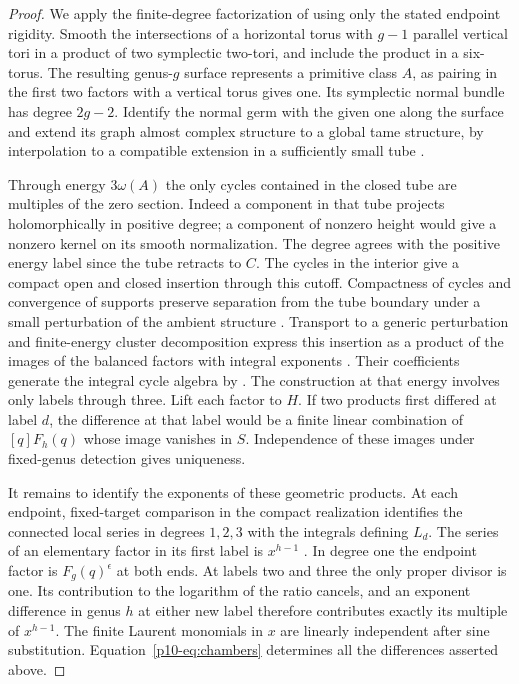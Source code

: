 \begin{proof}
We apply the finite-degree factorization of \cite[Corollary~3.2]{WueUnramified}
using only the stated endpoint rigidity. Smooth the intersections of a
horizontal torus with $g-1$ parallel vertical tori in a product of
two symplectic two-tori, and include the product in a six-torus. The
resulting genus-$g$ surface represents a primitive class $A$,
as pairing in the first two factors with a vertical torus gives
one. Its symplectic normal bundle has degree $2g-2$. Identify the
normal germ with the given one along the surface and extend its graph
almost complex structure to a global tame structure, by interpolation
to a compatible extension in a sufficiently small tube
\cite[proof of Proposition~3.1]{WueUnramified}.

Through energy $3\omega(A)$ the only cycles contained in the
closed tube are multiples of the zero section. Indeed a component
in that tube projects holomorphically in positive degree; a component
of nonzero height would give a nonzero kernel on its smooth
normalization. The degree agrees with the positive energy label since
the tube retracts to $C$. The cycles in the interior give a compact
open and closed insertion through this cutoff. Compactness of cycles
and convergence of supports preserve separation from the tube
boundary under a small perturbation of the ambient structure
\cite{diw}. Transport to a generic perturbation and finite-energy
cluster decomposition express this insertion as a product of the
images of the balanced factors with integral exponents
\cite[Corollary~3.2]{WueUnramified}. Their coefficients generate the integral
cycle algebra by \cite[Theorem~1.1]{WueGenerators}. The construction at that energy involves
only labels through three. Lift each factor to $H$. If two products
first differed at label $d$, the difference at that label would be
a finite linear combination of $[q]F_h(q)$ whose image vanishes
in $S$. Independence of these images under fixed-genus detection
\cite[Theorem~5.1]{WueProduct} gives
uniqueness.

It remains to identify the exponents of these geometric products.
At each endpoint, fixed-target comparison in the compact realization
\cite[Theorem~1.2]{zinger} identifies the connected local series
in degrees $1,2,3$ with the integrals defining $L_d$. The series
of an elementary factor in its first label is $x^{h-1}$
\cite[Theorem~2]{pandhodge}. In degree one the endpoint factor is
$F_g(q)^{\epsilon}$ at both ends. At labels two and three the only
proper divisor is one. Its contribution to the logarithm of the
ratio cancels, and an exponent difference in genus $h$ at either
new label therefore contributes exactly its multiple of $x^{h-1}$.
The finite Laurent monomials in $x$ are linearly independent after
sine substitution. Equation~\eqref{p10-eq:chambers} determines all
the differences asserted above.
\end{proof}

